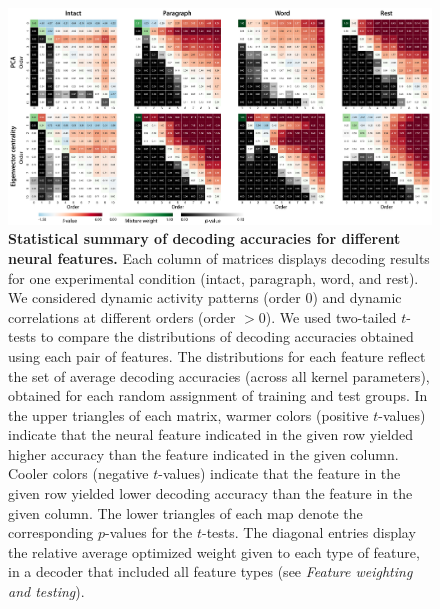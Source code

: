 \documentclass[english]{article}
\begin{document}
\begin{figure}[tp]
\centering
\includegraphics[width=1\textwidth]{figs/stats_heatmaps}
\caption{\textbf{Statistical summary of decoding accuracies for
    different neural features.}  Each column of matrices displays decoding
  results for one experimental condition (intact, paragraph, word, and
  rest).  We considered dynamic activity patterns (order 0) and
  dynamic correlations at different orders (order $> 0$).  We used
  two-tailed $t$-tests to compare the
  distributions of decoding accuracies obtained using each pair of
  features.  The distributions for each feature reflect the set of
  average decoding accuracies (across all kernel parameters), obtained
  for each random assignment of training and test groups.
  In the upper triangles of each matrix, warmer colors (positive $t$-values) indicate that the
  neural feature indicated in the given row yielded higher accuracy than the
  feature indicated in the given column.  Cooler colors (negative
  $t$-values) indicate that
  the feature in the given row yielded lower decoding accuracy than
  the feature in the given column.  The lower triangles of each map
  denote the corresponding $p$-values for the $t$-tests.  The diagonal
  entries display the relative average optimized weight given to each type of feature, in
  a decoder that included all feature types (see \textit{Feature
    weighting and testing}).}
\label{fig:ttests}
\end{figure}
\end{document}
